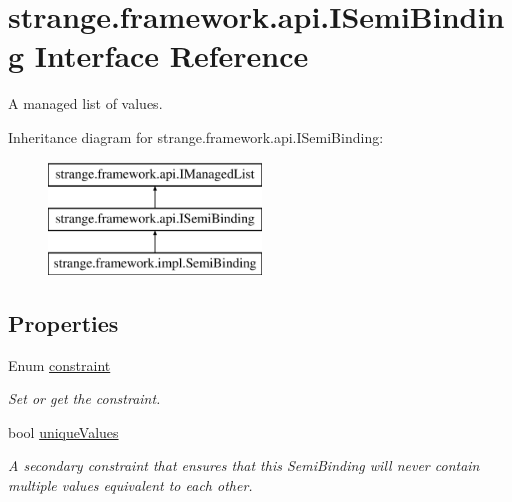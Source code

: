 \hypertarget{interfacestrange_1_1framework_1_1api_1_1_i_semi_binding}{\section{strange.\-framework.\-api.\-I\-Semi\-Binding Interface Reference}
\label{interfacestrange_1_1framework_1_1api_1_1_i_semi_binding}
}


A managed list of values.  


Inheritance diagram for strange.\-framework.\-api.\-I\-Semi\-Binding\-:\begin{figure}[H]
\begin{center}
\leavevmode
\includegraphics[height=3.000000cm]{interfacestrange_1_1framework_1_1api_1_1_i_semi_binding}
\end{center}
\end{figure}
\subsection*{Properties}
\begin{DoxyCompactItemize}
\item 
\hypertarget{interfacestrange_1_1framework_1_1api_1_1_i_semi_binding_a66062d19019961c4db4449d4b986cbd2}{Enum \hyperlink{interfacestrange_1_1framework_1_1api_1_1_i_semi_binding_a66062d19019961c4db4449d4b986cbd2}{constraint}}\label{interfacestrange_1_1framework_1_1api_1_1_i_semi_binding_a66062d19019961c4db4449d4b986cbd2}

\begin{DoxyCompactList}\small\item\em Set or get the constraint. \end{DoxyCompactList}\item 
\hypertarget{interfacestrange_1_1framework_1_1api_1_1_i_semi_binding_a12a19a998a1eaa1442cc38bd1f5aad79}{bool \hyperlink{interfacestrange_1_1framework_1_1api_1_1_i_semi_binding_a12a19a998a1eaa1442cc38bd1f5aad79}{unique\-Values}}\label{interfacestrange_1_1framework_1_1api_1_1_i_semi_binding_a12a19a998a1eaa1442cc38bd1f5aad79}

\begin{DoxyCompactList}\small\item\em A secondary constraint that ensures that this Semi\-Binding will never contain multiple values equivalent to each other. \end{DoxyCompactList}\end{DoxyCompactItemize}
